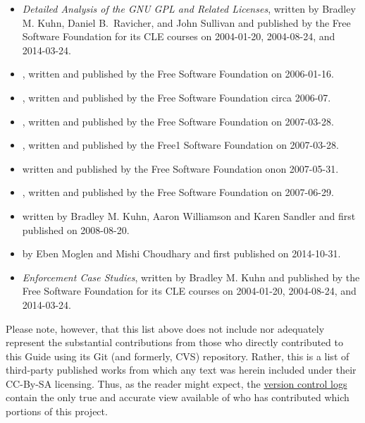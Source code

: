 \label{third-party-citation-list}
\begin{itemize}
\item \textit{Detailed Analysis of the GNU GPL and Related Licenses}, written by
Bradley M. Kuhn, Daniel B.~Ravicher, and John Sullivan and published by the Free Software Foundation for its CLE courses on 2004-01-20,
2004-08-24, and 2014-03-24.
\item {}, written and published by the Free
  Software Foundation on 2006-01-16.
\item {}, written and published by the Free
  Software Foundation circa 2006-07.
\item {}, written and published by the Free
  Software Foundation on   2007-03-28.
\item {}, written and published by the Free1 Software Foundation on   2007-03-28.
\item {} written and published by the Free
  Software Foundation onon 2007-05-31.
\item {}, written and published by the Free
  Software Foundation on 2007-06-29.
\item {} written by Bradley M. Kuhn, Aaron
Williamson and Karen Sandler and first published on 2008-08-20.
\item {} by Eben Moglen and Mishi Choudhary and first published on 2014-10-31.
\item \textit{Enforcement Case Studies}, written by Bradley M. Kuhn and published by the Free
  Software Foundation for its CLE courses  on 2004-01-20, 2004-08-24, and 2014-03-24.
\end{itemize}

Please note, however, that this list above does not include nor adequately
represent the substantial contributions from those who directly
contributed to this Guide using its Git (and formerly, CVS) repository.
Rather, this is a list of third-party published works from which any text was
herein included under their CC-By-SA licensing.  Thus, as the reader might
expect, the
\href{https://gitorious.org/copyleft-org/tutorial/history/master}{version
  control logs} contain the only true and accurate view available of who has
contributed which portions of this project.
